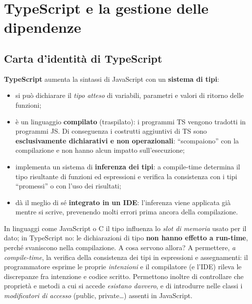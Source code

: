 \chapter{TypeScript e la gestione delle dipendenze}

\section{Carta d'identit\`a di TypeScript}

\begin{definizione}[TypeScript]
\textbf{TypeScript} aumenta la sintassi di JavaScript con un \textbf{sistema di tipi}:
\begin{itemize}
  \item si pu\`o dichiarare il \emph{tipo atteso} di variabili, parametri e valori di ritorno
        delle funzioni;
  \item \`e un linguaggio \textbf{compilato} (traspilato): i programmi TS vengono tradotti in
        programmi JS. Di conseguenza i costrutti aggiuntivi di TS sono \textbf{esclusivamente
        dichiarativi e non operazionali}: ``scompaiono'' con la compilazione e non hanno alcun
        impatto sull'esecuzione;
  \item implementa un sistema di \textbf{inferenza dei tipi}: a compile-time determina il tipo
        risultante di funzioni ed espressioni e verifica la consistenza con i tipi
        ``promessi'' o con l'uso dei risultati;
  \item d\`a il meglio di s\'e \textbf{integrato in un IDE}: l'inferenza viene applicata
        gi\`a mentre si scrive, prevenendo molti errori prima ancora della compilazione.
\end{itemize}
\end{definizione}

\begin{importante}
In linguaggi come JavaScript o C il tipo influenza lo \emph{slot di memoria} usato per il
dato; in TypeScript no: le dichiarazioni di tipo \textbf{non hanno effetto a run-time},
perch\'e svaniscono nella compilazione. A cosa servono allora? A permettere, \emph{a
compile-time}, la verifica della consistenza dei tipi in espressioni e assegnamenti: il
programmatore esprime le proprie \emph{intenzioni} e il compilatore (e l'IDE) rileva le
discrepanze fra intenzione e codice scritto. Permettono inoltre di controllare che
propriet\`a e metodi a cui si accede \emph{esistano davvero}, e di introdurre nelle classi i
\emph{modificatori di accesso} (public, private\dots) assenti in JavaScript.
\end{importante}

